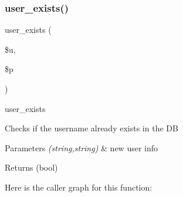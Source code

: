 \subsubsection{\texorpdfstring{user\+\_\+exists()}{user\_exists()}}
{\footnotesize\ttfamily user\+\_\+exists (\begin{DoxyParamCaption}\item[{}]{\$u,  }\item[{}]{\$p }\end{DoxyParamCaption})}

user\+\_\+exists

Checks if the username already exists in the DB 
\begin{DoxyParams}{Parameters}
{\em (string,string)} & new user info \\
\hline
\end{DoxyParams}
\begin{DoxyReturn}{Returns}
(bool) 
\end{DoxyReturn}
Here is the caller graph for this function\+:
